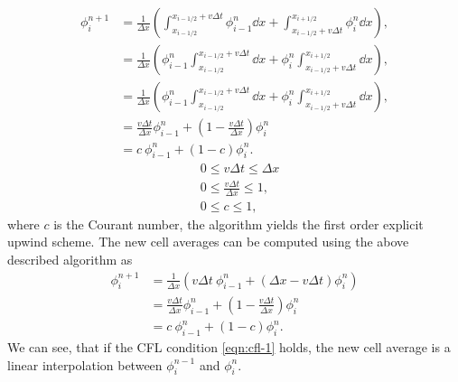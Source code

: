 \documentclass[../thesis.tex]{subfiles}
\begin{document}
\begin{equation*}
    \begin{split}
        \phi_{i}^{n+1}
        &= \frac{1}{\Delta x}\left(
            \int_{x_{i-1/2}}^{x_{i-1/2} + v\Delta t}\phi_{i-1}^{n} \dd{x}
            + \int_{x_{i-1/2} + v\Delta t}^{x_{i+1/2}}\phi_{i}^{n} \dd{x}
            \right),
        \\
        &= \frac{1}{\Delta x}\left(
            \phi_{i-1}^{n}\int_{x_{i-1/2}}^{x_{i-1/2} + v\Delta t} \dd{x}
            + \phi_{i}^{n}\int_{x_{i-1/2} + v\Delta t}^{x_{i+1/2}} \dd{x}
            \right),
        \\
        &= \frac{1}{\Delta x}\left(
            \phi_{i-1}^{n}\int_{x_{i-1/2}}^{x_{i-1/2} + v\Delta t} \dd{x}
            + \phi_{i}^{n}\int_{x_{i-1/2} + v\Delta t}^{x_{i+1/2}} \dd{x}
            \right),
        \\
        &=\frac{v\Delta t}{\Delta x}\phi_{i-1}^{n}
        + \left( 1 - \frac{v\Delta t}{\Delta x} \right)\phi_{i}^{n}
        \\
        &= c~\phi_{i-1}^{n}
        + \left( 1 - c \right)\phi_{i}^{n}.
    \end{split}
\end{equation*}
\begin{equation}\label{eqn:cfl-1}
    \begin{split}
        &0 \leq v\Delta t \leq \Delta x
        \\
        &0 \leq \frac{v\Delta t}{\Delta x} \leq 1,
        \\
        &0 \leq c \leq 1,
    \end{split}
\end{equation}
where \(c\) is the Courant number, the algorithm yields the first order explicit upwind scheme.
The new cell averages can be computed using the above described algorithm as
\begin{equation}\label{eqn:explicit-upwind-1}
    \begin{split}
        \phi_{i}^{n+1} &=\frac{1}{\Delta x}\left(
            v\Delta t~\phi_{i-1}^{n} + \left( \Delta x - v\Delta t \right)\phi_{i}^{n}
        \right)
        \\
        &=\frac{v\Delta t}{\Delta x}\phi_{i-1}^{n}
        + \left( 1 - \frac{v\Delta t}{\Delta x} \right)\phi_{i}^{n}
        \\
        &= c~\phi_{i-1}^{n}
        + \left( 1 - c \right)\phi_{i}^{n}.
    \end{split}
\end{equation}
We can see, that if the CFL condition \eqref{eqn:cfl-1} holds, the new cell
average is a linear interpolation between \(\phi_{i}^{n-1}\) and \(\phi_{i}^{n}\).
\end{document}
